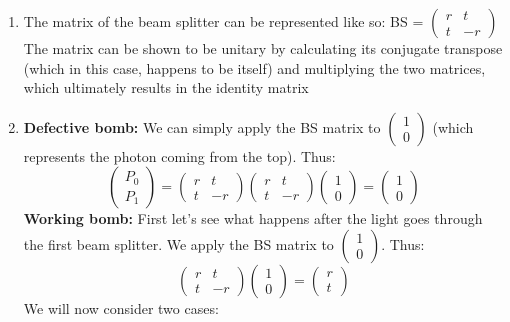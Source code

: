 \begin{sol}
\begin{enumerate}[label=\textbf{(\alph*)}]
\item The matrix of the beam splitter can be represented like so: 
BS = $\begin{pmatrix} r & t \\ t & -r \end{pmatrix}$
The matrix can be shown to be unitary by calculating its conjugate transpose (which in this case, happens to be itself) and multiplying the two matrices, which ultimately results in the identity matrix
\item \textbf{Defective bomb:} We can simply apply the BS matrix to $\begin{pmatrix} 1 \\ 0\end{pmatrix}$ (which represents the photon coming from the top). Thus:
$$
\begin{pmatrix} 
P_0 \\ 
P_1
\end{pmatrix} =
\begin{pmatrix}
r & t \\
t & -r 
\end{pmatrix}
\begin{pmatrix}
r & t \\
t & -r
\end{pmatrix}
\begin{pmatrix}
1 \\ 
0
\end{pmatrix}
=
\begin{pmatrix}
1 \\
0
\end{pmatrix}
$$
\textbf{Working bomb:} First let's see what happens after the light goes through the first beam splitter. We apply the BS matrix to $\begin{pmatrix} 1 \\ 0\end{pmatrix}$. Thus:
$$
\begin{pmatrix}
r & t \\
t & -r 
\end{pmatrix}
\begin{pmatrix}
1 \\ 
0
\end{pmatrix}
=
\begin{pmatrix}
r \\
t
\end{pmatrix}
$$
We will now consider two cases:
\begin{itemize}

\end{itemize}
\end{enumerate}
\end{sol}
